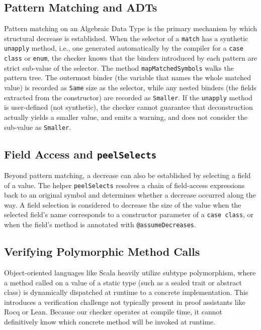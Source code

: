 \subsection{Pattern Matching and ADTs}
Pattern matching on an Algebraic Data Type is the primary mechanism by which
structural decrease is established. When the selector of a \texttt{match} has
a synthetic \texttt{unapply} method, i.e., one generated automatically by the
compiler for a \texttt{case class} or \texttt{enum}, the checker knows that
the binders introduced by each pattern are strict sub-value of the
selector. The method \texttt{mapMatchedSymbols} walks the pattern tree. The
outermost binder (the variable that names the whole matched value) is recorded
as \texttt{Same} size as the selector, while any nested binders (the fields
extracted from the constructor) are recorded as \texttt{Smaller}.
If the \texttt{unapply} method is user-defined (not synthetic), the checker
cannot guarantee that deconstruction actually yields a smaller value, and
emits a warning, and does not consider the sub-value as \texttt{Smaller}.

\subsection{Field Access and \texttt{peelSelects}}
Beyond pattern matching, a decrease can also be established by selecting a
field of a value. The helper \texttt{peelSelects} resolves a chain of
field-access expressions back to an original symbol and determines whether a
decrease occurred along the way. A field selection is considered to decrease
the size of the value when the selected field's name corresponds to a
constructor parameter of a \texttt{case class}, or when the field's method is
annotated with \texttt{@assumeDecreases}.

\subsection{Verifying Polymorphic Method Calls}
Object-oriented languages like Scala heavily utilize subtype polymorphism, where
a method called on a value of a static type (such as a sealed trait or abstract
class) is dynamically dispatched at runtime to a concrete implementation. This
introduces a verification challenge not typically present in proof assistants
like Rocq or Lean. Because our checker operates at compile time, it cannot
definitively know which concrete method will be invoked at runtime.

